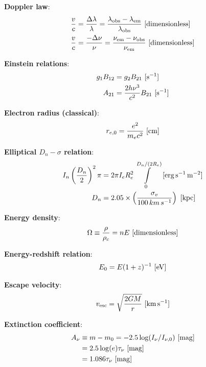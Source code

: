 \documentclass[a4paper,11pt]{article}
\begin{document}
{\noindent}\textbf{Doppler law}:
\begin{align*}
    \frac{v}{c} &= \frac{\Delta\lambda}{\lambda} =  \frac{\lambda_\mathrm{obs}-\lambda_\mathrm{em}}{\lambda_\mathrm{obs}} ~ [{\rm dimensionless}] \\
    \frac{v}{c} &= \frac{-\Delta\nu}{\nu} =  \frac{\nu_\mathrm{em}-\nu_\mathrm{obs}}{\nu_\mathrm{em}} ~ [{\rm dimensionless}]
\end{align*}

{\noindent}\textbf{Einstein relations}:
\begin{align*}
    g_1B_{12} &= g_2B_{21} ~ [{\rm s^{-1}}] \\
    A_{21}    &= \frac{2h\nu^3}{c^2}B_{21}  ~ [{\rm s^{-1}}]
\end{align*}

{\noindent}\textbf{Electron radius (classical)}:
\begin{align*}
    r_{e,0} = \frac{e^2}{m_ec^2} ~ [{\rm cm}]
\end{align*}

{\noindent}\textbf{Elliptical $D_n-\sigma$ relation}:
\begin{align*}
    I_n\left(\frac{D_n}{2}\right)^2\pi &= 2\pi I_eR_e^2 \int\limits_0^{D_n/(2R_e)} ~ [{\rm erg\,s^{-1}\,m^{-2}}] \\
    D_n &= 2.05\times\left(\frac{\sigma_v}{100\,km\,s^{-1}}\right) ~ [{\rm kpc}]
\end{align*}

{\noindent}\textbf{Energy density}:
\begin{align*}
    \Omega \equiv \dfrac{\rho}{\rho_c} = nE ~ [{\rm dimensionless}]
\end{align*}

{\noindent}\textbf{Energy-redshift relation}:
\begin{align*}
    E_0 = E(1+z)^{-1} ~ [{\rm eV}]
\end{align*}

{\noindent}\textbf{Escape velocity}:
\begin{align*}
    v_\mathrm{esc} = \sqrt{\frac{2GM}{r}} ~ [{\rm km\,s^{-1}}]
\end{align*}

{\noindent}\textbf{Extinction coefficient}:
\begin{align*}
    A_\nu &\equiv m-m_0 = -2.5\log(I_\nu/I_{\nu,0}) ~ [{\rm mag}] \\
          &= 2.5\log(e)\tau_\nu ~ [{\rm mag}] \\
          &= 1.086\tau_\nu ~ [{\rm mag}]
\end{align*}
\end{document}
